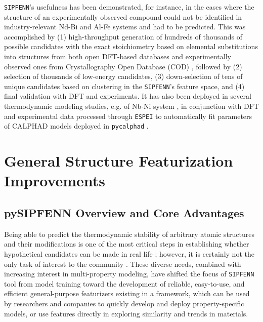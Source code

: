 \texttt{SIPFENN}'s usefulness has been demonstrated, for instance, in the cases where the structure of an experimentally observed compound could not be identified in industry-relevant Nd-Bi \cite{Im2022ThermodynamicModeling} and Al-Fe \cite{Shang2021FormingJoints} systems and had to be predicted. This was accomplished by (1) high-throughput generation of hundreds of thousands of possible candidates with the exact stoichiometry based on elemental substitutions into structures from both open DFT-based databases \cite{Saal2013MaterialsOQMD, Kirklin2015TheEnergies, Shen2022ReflectionsOQMD, Curtarolo2013AFLOW:Discovery, Toher2018TheDiscovery, Jain2013Commentary:Innovation, Choudhary2020TheDesign, Schmidt2022AFunctionals, Merchant2023ScalingDiscovery} and experimentally observed ones from Crystallography Open Database (COD) \cite{Grazulis2009CrystallographyStructures, Grazulis2012CrystallographyCollaboration, Grazulis2019CrystallographyPerspectives}, followed by (2) selection of thousands of low-energy candidates, (3) down-selection of tens of unique candidates based on clustering in the \texttt{SIPFENN}'s feature space, and (4) final validation with DFT and experiments. It has also been deployed in several thermodynamic modeling studies, e.g. of Nb-Ni system \cite{Sun2023ThermodynamicESPEI}, in conjunction with DFT and experimental data processed through \texttt{ESPEI} \cite{Bocklund2019ESPEICuMg} to automatically fit parameters of CALPHAD \cite{Olson2023GenomicDynamics} models deployed in \texttt{pycalphad} \cite{Otis2017Pycalphad:Python}.


\section{General Structure Featurization Improvements} \label{pysipfenn:sec:featurization}

\subsection{pySIPFENN Overview and Core Advantages} \label{pysipfenn:ssec:coreimprovements}

Being able to predict the thermodynamic stability of arbitrary atomic structures and their modifications is one of the most critical steps in establishing whether hypothetical candidates can be made in real life \cite{Zunger2019BewareMaterials}; however, it is certainly not the only task of interest to the community \cite{Jha2023MachineChallenges, Tao2021MachineDiscovery}. These diverse needs, combined with increasing interest in multi-property modeling, have shifted the focus of \texttt{SIPFENN} tool from model training \cite{Krajewski2022ExtensibleNetworks} toward the development of reliable, easy-to-use, and efficient general-purpose featurizers existing in a framework, which can be used by researchers and companies to quickly develop and deploy property-specific models, or use features directly in exploring similarity and trends in materials.


